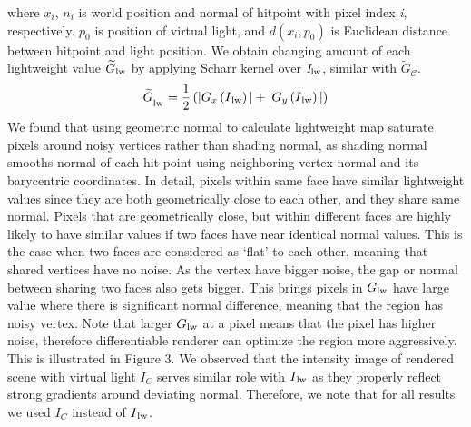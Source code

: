 where $x_i$, $n_i$ is world position and normal of hitpoint with pixel index \textit{i}, respectively. 
$p_0$ is position of virtual light, and $d\left(x_i, p_0\right)$ is Euclidean distance between hitpoint and light position.
We obtain changing amount of each lightweight value $\widetilde{G}\textsubscript{lw}$ by applying Scharr kernel over $\textit{I}\textsubscript{lw}$, similar with $\widetilde{G}_\mathcal{C}$.
\begin{equation}
    \widetilde{G}_\textsubscript{lw}=\frac{1}{2}\left(|G_x\left(I\textsubscript{lw}\right)|+|G_y\left(I\textsubscript{lw}\right)|\right)
\end{equation}
We found that using geometric normal to calculate lightweight map saturate pixels around noisy vertices rather than shading normal, 
as shading normal smooths normal of each hit-point using neighboring vertex normal and its barycentric coordinates. 
In detail, pixels within same face have similar lightweight values 
since they are both geometrically close to each other, and they share same normal. 
Pixels that are geometrically close, but within different faces 
are highly likely to have similar values if two faces have near identical normal values. 
This is the case when two faces are considered as ‘flat’ to each other, 
meaning that shared vertices have no noise. 
As the vertex have bigger noise, the gap or normal between sharing two faces also gets bigger. 
This brings pixels in $G\textsubscript{lw}$ have large value where there is significant normal difference, meaning that the region has noisy vertex. 
Note that larger $G\textsubscript{lw}$ at a pixel means that the pixel has higher noise, therefore differentiable renderer can optimize the region more aggressively. 
This is illustrated in Figure 3.
We observed that the intensity image of rendered scene with virtual light $I_C$ serves similar role with $I\textsubscript{lw}$ as they properly reflect strong gradients around deviating normal.
Therefore, we note that for all results we used $I_C$ instead of $I\textsubscript{lw}$.
